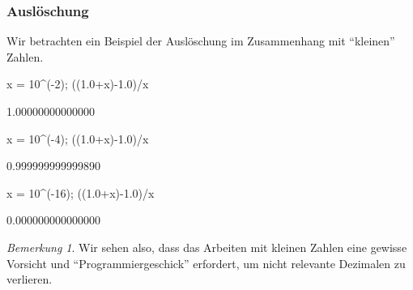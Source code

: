 \documentclass[fontsize=12pt,paper=a4,twoside,bibtotoc,idxtotoc,
liststotoc,pagesize,BCOR1.2cm,DIV15,chapterprefix,pagesize=pdftex]{scrbook}
\theoremstyle{plain}
\theoremstyle{definition}
\theoremstyle{remark}
\newtheorem{bem}[equation]{Bemerkung}
\begin{document}
\subsubsection{Auslöschung}
Wir betrachten ein Beispiel der Auslöschung im Zusammenhang mit ``kleinen'' Zahlen.
\begin{sagein}
x = 10^(-2); ((1.0+x)-1.0)/x
\end{sagein}
\begin{sage}
  1.00000000000000
\end{sage}
\begin{sagein}
x = 10^(-4); ((1.0+x)-1.0)/x
\end{sagein}
\begin{sage}
 0.999999999999890
\end{sage}
\begin{sagein}
x = 10^(-16); ((1.0+x)-1.0)/x
\end{sagein}
\begin{sage}
  0.000000000000000
\end{sage}
\begin{bem}
 Wir sehen also, dass das Arbeiten mit kleinen Zahlen eine gewisse Vorsicht und ``Programmiergeschick'' erfordert, um nicht 
relevante Dezimalen zu verlieren.
\end{bem}
\end{document}
